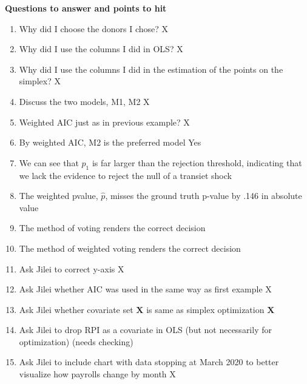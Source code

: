 \documentclass[11pt]{article}
\theoremstyle{definition}
\begin{document}
\textbf{Questions to answer and points to hit}
\begin{enumerate}
\item Why did I choose the donors I chose? X 
\item Why did I use the columns I did in OLS? X
\item Why did I use the columns I did in the estimation of the points on the simplex? X
\item Discuss the two models, M1, M2 X
\item Weighted AIC just as in previous example?  X
\item By weighted AIC, M2 is the preferred model Yes
\item We can see that $p_{1}$ is far larger than the rejection threshold, indicating that we lack the evidence to reject the null of a transiet shock
\item The weighted pvalue, $\hat p $, misses the ground truth p-value by .146 in absolute value
\item The method of voting renders the correct decision
\item The method of weighted voting renders the correct decision
\item Ask Jilei to correct y-axis X
\item Ask Jilei whether AIC was used in the same way as first example X
\item Ask Jilei whether covariate set $\textbf{X}$ is same as simplex optimization $\textbf{X}$ 
\item Ask Jilei to drop RPI as a covariate in OLS (but not necessarily for optimization) (needs checking)
\item Ask Jilei to include chart with data stopping at March 2020 to better visualize how payrolls change by month X

\end{enumerate}
\end{document}
